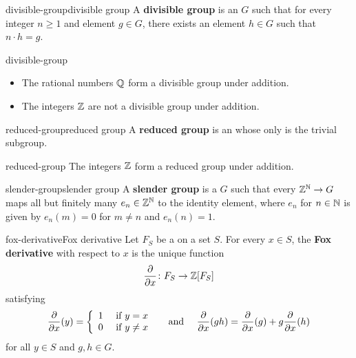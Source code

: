 \begin{topic}{divisible-group}{divisible group}
    A \textbf{divisible group} is an  $G$ such that for every integer $n \ge 1$ and element $g \in G$, there exists an element $h \in G$ such that $n \cdot h = g$.
\end{topic}

\begin{example}{divisible-group}
    \begin{itemize}
        \item The rational numbers $\mathbb{Q}$ form a divisible group under addition.
        \item The integers $\mathbb{Z}$ are not a divisible group under addition.
    \end{itemize}
\end{example}

\begin{topic}{reduced-group}{reduced group}
    A \textbf{reduced group} is an  whose only   is the trivial subgroup.
\end{topic}

\begin{example}{reduced-group}
    The integers $\mathbb{Z}$ form a reduced group under addition.
\end{example}

\begin{topic}{slender-group}{slender group}
    A \textbf{slender group} is a   $G$ such that every  $\mathbb{Z}^{\mathbb{N}} \to G$ maps all but finitely many $e_n \in \mathbb{Z}^{\mathbb{N}}$ to the identity element, where $e_n$ for $n \in \mathbb{N}$ is given by $e_n(m) = 0$ for $m \ne n$ and $e_n(n) = 1$.
\end{topic}

\begin{topic}{fox-derivative}{Fox derivative}
    Let $F_S$ be a  on a set $S$. For every $x \in S$, the \textbf{Fox derivative} with respect to $x$ is the unique function
    \[ \frac{\partial}{\partial x} \colon F_S \to \mathbb{Z}[F_S] \]
    satisfying
    \[ \frac{\partial}{\partial x}(y) = \left\{ \begin{array}{cl} 1 & \textup{ if } y = x \\ 0 & \text{ if } y \ne x \end{array} \right. \quad \textup{ and } \quad \frac{\partial}{\partial x}(g h) = \frac{\partial}{\partial x}(g) + g \frac{\partial}{\partial x}(h) \]
    for all $y \in S$ and $g, h \in G$.
\end{topic}

